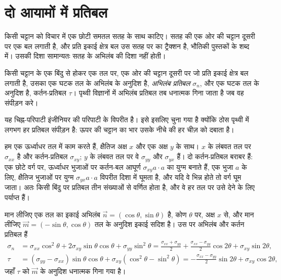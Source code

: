 \section{दो आयामों में प्रतिबल}\label{sec:b1:stress-strain-rheology:stress}

किसी चट्टान को विचार में एक छोटी समतल सतह के साथ काटिए। सतह की एक ओर की चट्टान दूसरी पर एक बल लगाती है, और प्रति इकाई क्षेत्र बल उस सतह पर का ट्रैक्शन है, भौतिकी पुस्तकों के शब्द में। उसकी दिशा सामान्यतः सतह के अभिलंब की दिशा नहीं होती।

\begin{definition}[अभिलंब प्रतिबल]
\label{def:b1:stress-strain-rheology:stress}
किसी चट्टान के एक बिंदु से होकर एक तल पर, एक ओर की चट्टान दूसरी पर जो प्रति इकाई क्षेत्र बल लगाती है, उसका एक घटक तल के अभिलंब के अनुदिश है, \emph{अभिलंब प्रतिबल} $\sigma_n$, और एक घटक तल के अनुदिश है, कर्तन-प्रतिबल $\tau$। पृथ्वी विज्ञानों में अभिलंब प्रतिबल तब धनात्मक गिना जाता है जब वह संपीड़न करे।
\end{definition}

यह चिह्न-परिपाटी इंजीनियर की परिपाटी के विपरीत है। इसे इसलिए चुना गया है क्योंकि ठोस पृथ्वी में लगभग हर प्रतिबल संपीड़न है: ऊपर की चट्टान का भार उसके नीचे की हर चीज़ को दबाता है।

हम एक ऊर्ध्वाधर तल में काम करते हैं, क्षैतिज अक्ष $x$ और एक अक्ष $y$ के साथ। $x$ के लंबवत तल पर  $\sigma_{xx}$ है और कर्तन-प्रतिबल $\sigma_{xy}$; $y$ के लंबवत तल पर वे $\sigma_{yy}$ और $\sigma_{yx}$ हैं। दो कर्तन-प्रतिबल बराबर हैं: एक छोटे वर्ग पर, ऊर्ध्वाधर भुजाओं पर कर्तन-बल आघूर्ण $\sigma_{xy}a\cdot a$ का युग्म बनाते हैं, एक भुजा $a$ के लिए, क्षैतिज भुजाओं पर युग्म $\sigma_{yx}a\cdot a$ विपरीत दिशा में घूमता है, और यदि वे भिन्न होते तो वर्ग घूम जाता। अतः किसी बिंदु पर प्रतिबल तीन संख्याओं से वर्णित होता है, और वे हर तल पर उसे देने के लिए पर्याप्त हैं।

\begin{proposition}[झुके तल पर प्रतिबल]
\label{prop:b1:stress-strain-rheology:transformation}
मान लीजिए एक तल का इकाई अभिलंब $\vec n = (\cos\theta, \sin\theta)$ है, कोण $\theta$ पर, अक्ष $x$ से, और मान लीजिए $\vec m = (-\sin\theta, \cos\theta)$ तल के अनुदिश इकाई सदिश है। उस पर अभिलंब और कर्तन प्रतिबल हैं
\begin{align*}
  \sigma_n &= \sigma_{xx}\cos^2\theta + 2\sigma_{xy}\sin\theta\cos\theta + \sigma_{yy}\sin^2\theta
           = \frac{\sigma_{xx}+\sigma_{yy}}{2} + \frac{\sigma_{xx}-\sigma_{yy}}{2}\cos2\theta + \sigma_{xy}\sin2\theta, \\
  \tau     &= (\sigma_{yy}-\sigma_{xx})\sin\theta\cos\theta + \sigma_{xy}(\cos^2\theta - \sin^2\theta)
           = -\frac{\sigma_{xx}-\sigma_{yy}}{2}\sin2\theta + \sigma_{xy}\cos2\theta ,
\end{align*}
जहाँ $\tau$ को $\vec m$ के अनुदिश धनात्मक गिना गया है।
\end{proposition}

